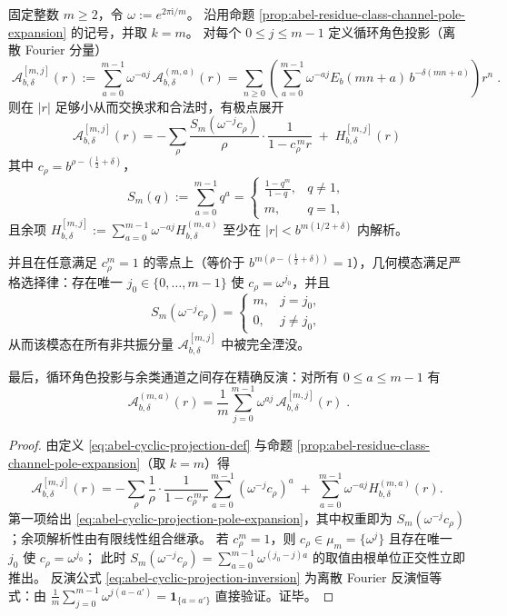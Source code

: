 \begin{proposition}\label{prop:abel-cyclic-character-projection}
固定整数 \(m\ge 2\)，令 \(\omega:=e^{2\pi \mathrm{i}/m}\)。
沿用命题 \ref{prop:abel-residue-class-channel-pole-expansion} 的记号，并取 \(k=m\)。
对每个 \(0\le j\le m-1\) 定义循环角色投影（离散 Fourier 分量）
\begin{equation}\label{eq:abel-cyclic-projection-def}
\boxed{\;
\mathcal A_{b,\delta}^{[m,j]}(r):=\sum_{a=0}^{m-1}\omega^{-aj}\,\mathcal A_{b,\delta}^{(m,a)}(r)
=\sum_{n\ge 0}\left(\sum_{a=0}^{m-1}\omega^{-aj}E_b(mn+a)\,b^{-\delta(mn+a)}\right)r^n\; }.
\end{equation}
则在 \(|r|\) 足够小从而交换求和合法时，有极点展开
\begin{equation}\label{eq:abel-cyclic-projection-pole-expansion}
\boxed{\;
\mathcal A_{b,\delta}^{[m,j]}(r)
=-\sum_{\rho}\frac{S_m(\omega^{-j}c_\rho)}{\rho}\cdot\frac{1}{1-c_\rho^{\,m}r}
\;+\;H_{b,\delta}^{[m,j]}(r)\;}
\end{equation}
其中 \(c_\rho=b^{\rho-(\frac12+\delta)}\)，
\[
S_m(q):=\sum_{a=0}^{m-1}q^a
=\begin{cases}
\frac{1-q^m}{1-q},&q\neq 1,\\
m,&q=1,
\end{cases}
\]
且余项 \(H_{b,\delta}^{[m,j]}:=\sum_{a=0}^{m-1}\omega^{-aj}H_{b,\delta}^{(m,a)}\) 至少在 \(|r|<b^{m(1/2+\delta)}\) 内解析。
\par
并且在任意满足 \(c_\rho^m=1\) 的零点上（等价于 \(b^{m(\rho-(\frac12+\delta))}=1\)），几何模态满足严格选择律：存在唯一 \(j_0\in\{0,\dots,m-1\}\) 使 \(c_\rho=\omega^{j_0}\)，并且
\[
S_m(\omega^{-j}c_\rho)=
\begin{cases}
m,&j=j_0,\\
0,&j\neq j_0,
\end{cases}
\]
从而该模态在所有非共振分量 \(\mathcal A_{b,\delta}^{[m,j]}\) 中被完全湮没。
\par
最后，循环角色投影与余类通道之间存在精确反演：对所有 \(0\le a\le m-1\) 有
\begin{equation}\label{eq:abel-cyclic-projection-inversion}
\boxed{\;
\mathcal A_{b,\delta}^{(m,a)}(r)=\frac{1}{m}\sum_{j=0}^{m-1}\omega^{aj}\,\mathcal A_{b,\delta}^{[m,j]}(r)\; }.
\end{equation}
\end{proposition}
\begin{proof}
由定义 \eqref{eq:abel-cyclic-projection-def} 与命题 \ref{prop:abel-residue-class-channel-pole-expansion}（取 \(k=m\)）得
\[
\mathcal A_{b,\delta}^{[m,j]}(r)
=-\sum_{\rho}\frac{1}{\rho}\cdot\frac{1}{1-c_\rho^{\,m}r}\sum_{a=0}^{m-1}(\omega^{-j}c_\rho)^a
\;+\;\sum_{a=0}^{m-1}\omega^{-aj}H_{b,\delta}^{(m,a)}(r).
\]
第一项给出 \eqref{eq:abel-cyclic-projection-pole-expansion}，其中权重即为 \(S_m(\omega^{-j}c_\rho)\)；余项解析性由有限线性组合继承。
若 \(c_\rho^m=1\)，则 \(c_\rho\in\mu_m=\{\omega^j\}\) 且存在唯一 \(j_0\) 使 \(c_\rho=\omega^{j_0}\)；
此时 \(S_m(\omega^{-j}c_\rho)=\sum_{a=0}^{m-1}\omega^{(j_0-j)a}\) 的取值由根单位正交性立即推出。
反演公式 \eqref{eq:abel-cyclic-projection-inversion} 为离散 Fourier 反演恒等式：由
\(
\frac{1}{m}\sum_{j=0}^{m-1}\omega^{j(a-a')}=\mathbf 1_{\{a=a'\}}
\)
直接验证。证毕。
\end{proof}

